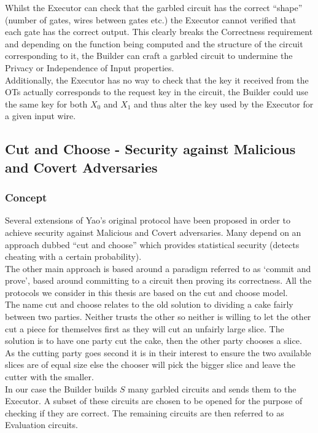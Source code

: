 \documentclass[ %
                    author={Nicholas Tutte},
                supervisor={Prof. Nigel Smart},
                    degree={MEng},
                     title={Secure Two Party Computation},
                  subtitle={A practical comparison of recent protocols},
                      type={Research - GG1K},
                      year={2015} ]{dissertation}
\begin{document}
			Whilst the Executor can check that the garbled circuit has the correct ``shape'' (number of gates, wires between gates etc.) the Executor cannot verified that each gate has the correct output. This clearly breaks the Correctness requirement and depending on the function being computed and the structure of the circuit corresponding to it, the Builder can craft a garbled circuit to undermine the Privacy or Independence of Input properties.\\

			Additionally, the Executor has no way to check that the key it received from the OTs actually corresponds to the request key in the circuit, the Builder could use the same key for both $X_0$ and $X_1$ and thus alter the key used by the Executor for a given input wire.


		\subsection{Cut and Choose - Security against Malicious and Covert Adversaries} \label{sub:YaoMalicious}
			\subsubsection{Concept}
				Several extensions of Yao's original protocol have been proposed in order to achieve security against Malicious and Covert adversaries. Many depend on an approach dubbed ``cut and choose'' which provides statistical security (detects cheating with a certain probability).\\

				The other main approach is based around a paradigm referred to as `commit and prove', based around committing to a circuit then proving its correctness. All the protocols we consider in this thesis are based on the cut and choose model.\\

				The name cut and choose relates to the old solution to dividing a cake fairly between two parties. Neither trusts the other so neither is willing to let the other cut a piece for themselves first as they will cut an unfairly large slice. The solution is to have one party cut the cake, then the other party chooses a slice. As the cutting party goes second it is in their interest to ensure the two available slices are of equal size else the chooser will pick the bigger slice and leave the cutter with the smaller.\\

				In our case the Builder builds $S$ many garbled circuits and sends them to the Executor. A subset of these circuits are chosen to be opened for the purpose of checking if they are correct. The remaining circuits are then referred to as Evaluation circuits.\\
\end{document}
